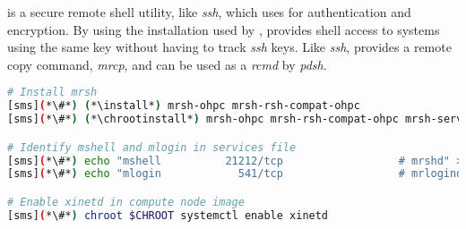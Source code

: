 \mrsh{} is a secure remote shell utility, like {\em ssh}, which uses \MUNGE{} 
for authentication and encryption. By using the \MUNGE{} installation used by 
\SLURM{}, \mrsh{} provides shell access to systems using the same \MUNGE{} key 
without having to track {\em ssh} keys. Like {\em ssh}, \mrsh{} provides a 
remote copy command, {\em mrcp}, and can be used as a {\em rcmd} by {\em pdsh}.

\begin{lstlisting}[language=bash,keywords={},upquote=true]
# Install mrsh
[sms](*\#*) (*\install*) mrsh-ohpc mrsh-rsh-compat-ohpc
[sms](*\#*) (*\chrootinstall*) mrsh-ohpc mrsh-rsh-compat-ohpc mrsh-server-ohpc

# Identify mshell and mlogin in services file
[sms](*\#*) echo "mshell          21212/tcp                  # mrshd" >> /etc/services
[sms](*\#*) echo "mlogin            541/tcp                  # mrlogind" >> /etc/services

# Enable xinetd in compute node image
[sms](*\#*) chroot $CHROOT systemctl enable xinetd
\end{lstlisting}

